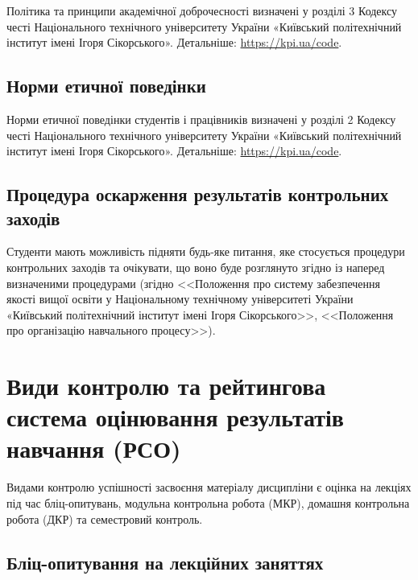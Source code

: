\documentclass{Syllabus}
\begin{document}
Політика та принципи академічної доброчесності визначені у розділі 3 Кодексу честі Національного технічного університету України «Київський політехнічний інститут імені Ігоря Сікорського». Детальніше: \url{https://kpi.ua/code}.

\subsection*{Норми етичної поведінки}

Норми етичної поведінки студентів і працівників визначені у розділі 2 Кодексу честі Національного технічного університету України «Київський політехнічний інститут імені Ігоря Сікорського». Детальніше: \url{https://kpi.ua/code}.

\subsection*{Процедура оскарження результатів контрольних заходів}

Студенти мають можливість підняти будь-яке питання, яке стосується процедури контрольних заходів та очікувати, що воно буде розглянуто згідно із наперед визначеними процедурами (згідно <<Положення про систему забезпечення якості вищої освіти у Національному технічному університеті України «Київський політехнічний інститут імені Ігоря Сікорського>>, <<Положення про організацію навчального процесу>>).

\section{Види контролю та рейтингова система оцінювання результатів навчання (РСО)}

%

Видами контролю успішності засвоєння матеріалу дисципліни є оцінка на лекціях під час бліц-опитувань,  модульна контрольна робота (МКР), домашня контрольна робота (ДКР) та семестровий контроль.

\subsection*{Бліц-опитування на лекційних заняттях}
\end{document}
